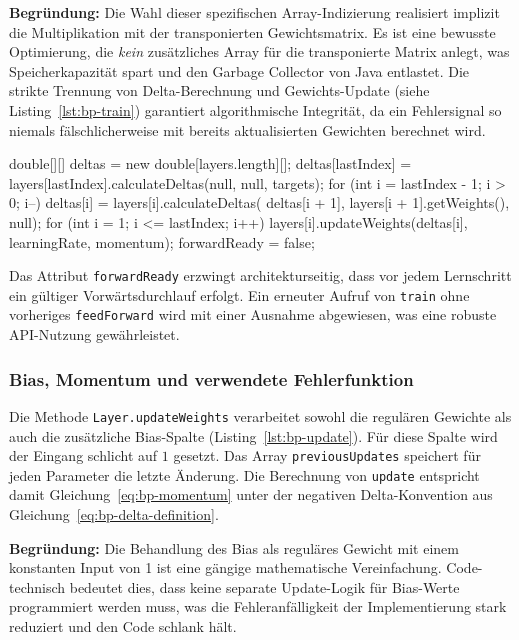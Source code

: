 \textbf{Begründung:} Die Wahl dieser spezifischen Array-Indizierung realisiert implizit die Multiplikation mit der transponierten Gewichtsmatrix. Es ist eine bewusste Optimierung, die \emph{kein} zusätzliches Array für die transponierte Matrix anlegt, was Speicherkapazität spart und den Garbage Collector von Java entlastet. Die strikte Trennung von Delta-Berechnung und Gewichts-Update (siehe Listing~\ref{lst:bp-train}) garantiert algorithmische Integrität, da ein Fehlersignal so niemals fälschlicherweise mit bereits aktualisierten Gewichten berechnet wird.

\begin{javacode}[label={lst:bp-train}]{}
	double[][] deltas = new double[layers.length][];
	deltas[lastIndex] = layers[lastIndex].calculateDeltas(null, null, targets);
	for (int i = lastIndex - 1; i > 0; i--) {
			deltas[i] = layers[i].calculateDeltas(
			deltas[i + 1], layers[i + 1].getWeights(), null);
		}
	for (int i = 1; i <= lastIndex; i++) {
			layers[i].updateWeights(deltas[i], learningRate, momentum);
		}
	forwardReady = false;
\end{javacode}

Das Attribut \texttt{forwardReady} erzwingt architekturseitig, dass vor jedem Lernschritt ein gültiger Vorwärtsdurchlauf erfolgt. Ein erneuter Aufruf von \texttt{train} ohne vorheriges \texttt{feedForward} wird mit einer Ausnahme abgewiesen, was eine robuste API-Nutzung gewährleistet.

\subsubsection{Bias, Momentum und verwendete Fehlerfunktion}

Die Methode \texttt{Layer.updateWeights} verarbeitet sowohl die regulären Gewichte als auch die zusätzliche Bias-Spalte (Listing~\ref{lst:bp-update}). Für diese Spalte wird der Eingang schlicht auf $1$ gesetzt. Das Array \texttt{previousUpdates} speichert für jeden Parameter die letzte Änderung. Die Berechnung von \texttt{update} entspricht damit Gleichung~\eqref{eq:bp-momentum} unter der negativen Delta-Konvention aus Gleichung~\eqref{eq:bp-delta-definition}.

\textbf{Begründung:} Die Behandlung des Bias als reguläres Gewicht mit einem konstanten Input von 1 ist eine gängige mathematische Vereinfachung. Code-technisch bedeutet dies, dass keine separate Update-Logik für Bias-Werte programmiert werden muss, was die Fehleranfälligkeit der Implementierung stark reduziert und den Code schlank hält.

